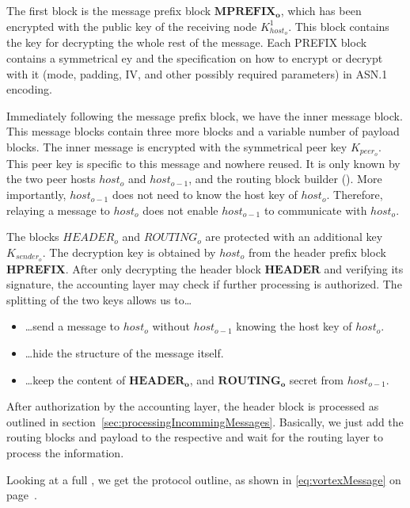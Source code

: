 The first block is the message prefix block $\mathbf{MPREFIX_o}$, which has been encrypted with the public key of the receiving node $K^1_{host_o}$. This block contains the key for decrypting the whole rest of the message. Each PREFIX block contains a symmetrical ey and the specification on how to encrypt or decrypt with it (mode, padding, IV, and other possibly required parameters) in ASN.1 encoding. 

Immediately following the message prefix block, we have the inner message block. This message blocks contain three more blocks and a variable number of payload blocks. The inner message is encrypted with the symmetrical peer key $K_{peer_o}$. This peer key is specific to this message and nowhere reused. It is only known by the two peer hosts $host_o$ and $host_{o-1}$, and the routing block builder (). More importantly, $host_{o-1}$ does not need to know the host key of $host_o$. Therefore, relaying a message to $host_o$ does not enable $host_{o-1}$ to communicate with $host_o$. 

The blocks $HEADER_o$ and $ROUTING_o$ are protected with an additional key $K_{sender_o}$. The decryption key is obtained by $host_o$ from the header prefix block $\mathbf{HPREFIX}$. After only decrypting the header block $\mathbf{HEADER}$ and verifying its signature, the accounting layer may check if further processing is authorized. The splitting of the two keys allows us to\ldots
\begin{itemize}
	\item \ldots send a message to $host_o$ without $host_{o-1}$ knowing the host key of $host_o$.
	\item \ldots hide the structure of the message itself.
	\item \ldots keep the content of $\mathbf{HEADER_o}$, and $\mathbf{ROUTING_o}$ secret from $host_{o-1}$.
\end{itemize}

After authorization by the accounting layer, the header block is processed as outlined in section~\ref{sec:processingIncommingMessages}. Basically, we just add the routing blocks and payload to the respective  and wait for the routing layer to process the information.

Looking at a full \VortexMessage, we get the protocol outline, as shown in \eqref{eq:vortexMessage} on page~\pageref{eq:vortexMessage}.

